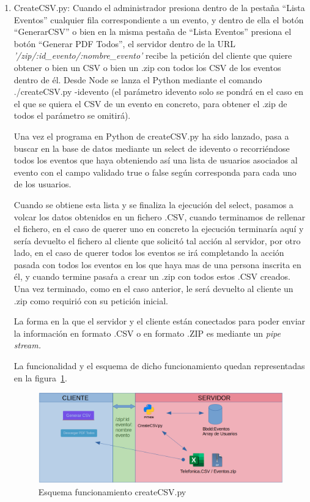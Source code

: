 \documentclass[a4paper, 12pt]{book}
\begin{document}
\begin{enumerate}
  	\item CreateCSV.py: Cuando el administrador presiona dentro de la pestaña ``Lista Eventos'' cualquier fila correspondiente a un evento, y dentro de ella el botón ``GenerarCSV'' o bien en la misma pestaña de ``Lista Eventos'' presiona el botón ``Generar PDF Todos'', el servidor dentro de la URL \textit{'/zip/:id\_evento/:nombre\_evento'} recibe la petición del cliente que quiere obtener o bien un CSV o bien un .zip con todos los CSV de los eventos dentro de él. Desde Node se lanza el Python mediante el comando ./createCSV.py -idevento (el parámetro idevento solo se pondrá en el caso en el que se quiera el CSV de un evento en concreto, para obtener el .zip de todos el parámetro se omitirá).
  	
  	Una vez el programa en Python de createCSV.py ha sido lanzado, pasa a buscar en la base de datos mediante un select de idevento o recorriéndose todos los eventos que haya obteniendo así una lista de usuarios asociados al evento con el campo validado true o false según corresponda para cada uno de los usuarios.
  	
  	Cuando se obtiene esta lista y se finaliza la ejecución del select, pasamos a volcar los datos obtenidos en un fichero .CSV, cuando terminamos de rellenar el fichero, en el caso de querer uno en concreto la ejecución terminaría aquí y sería devuelto el fichero al cliente que solicitó tal acción al servidor, por otro lado, en el caso de querer todos los eventos se irá completando la acción pasada con todos los eventos en los que haya mas de una persona inscrita en él, y cuando termine pasaŕa a crear un .zip con todos estos .CSV creados. Una vez terminado, como en el caso anterior, le será devuelto al cliente un .zip como requirió con su petición inicial.
  	
  	La forma en la que el servidor y el cliente están conectados para poder enviar la información en formato .CSV o en formato .ZIP es mediante un \textit{pipe stream.}
  	
  	La funcionalidad y el esquema de dicho funcionamiento quedan representadas en la figura~\ref{fig:createCSV}.

\begin{figure}[h!]
  \centering
  \includegraphics[width=16cm, keepaspectratio]{img/createCSV.png}
  	\caption{Esquema funcionamiento createCSV.py}\label{fig:createCSV}
\end{figure}  	
  	

\end{enumerate}
\end{document}

